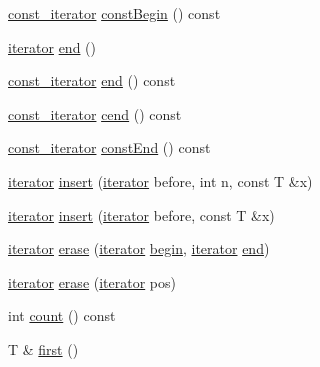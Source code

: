 \begin{DoxyCompactItemize}
\item 
\hyperlink{class_q_vector_a01e19bfad7fefd3e97ef197f4ed2cceb}{const\+\_\+iterator} \hyperlink{class_q_vector_a8f2ae9da9b4f929a1cbb718e2ff1a9ca}{const\+Begin} () const 
\item 
\hyperlink{class_q_vector_af6ac26e0dfede6e3045be0c947201267}{iterator} \hyperlink{class_q_vector_aee13fe5819dcac8aee22f40f31c2790b}{end} ()
\item 
\hyperlink{class_q_vector_a01e19bfad7fefd3e97ef197f4ed2cceb}{const\+\_\+iterator} \hyperlink{class_q_vector_ad13adb8ee2256f8b583509d7d9c4ca44}{end} () const 
\item 
\hyperlink{class_q_vector_a01e19bfad7fefd3e97ef197f4ed2cceb}{const\+\_\+iterator} \hyperlink{class_q_vector_aae87e757422aae4f12f8b8b60b2efb19}{cend} () const 
\item 
\hyperlink{class_q_vector_a01e19bfad7fefd3e97ef197f4ed2cceb}{const\+\_\+iterator} \hyperlink{class_q_vector_a86b54d84b2435c97d8ec62d5149eeee8}{const\+End} () const 
\item 
\hyperlink{class_q_vector_af6ac26e0dfede6e3045be0c947201267}{iterator} \hyperlink{class_q_vector_a85e9511cdd9b7949828749a8092af924}{insert} (\hyperlink{class_q_vector_af6ac26e0dfede6e3045be0c947201267}{iterator} before, int n, const T \&x)
\item 
\hyperlink{class_q_vector_af6ac26e0dfede6e3045be0c947201267}{iterator} \hyperlink{class_q_vector_acb1662d362fcf2fcc2ae820d08fd159d}{insert} (\hyperlink{class_q_vector_af6ac26e0dfede6e3045be0c947201267}{iterator} before, const T \&x)
\item 
\hyperlink{class_q_vector_af6ac26e0dfede6e3045be0c947201267}{iterator} \hyperlink{class_q_vector_af58c46c4f0db158717e382fe894c1484}{erase} (\hyperlink{class_q_vector_af6ac26e0dfede6e3045be0c947201267}{iterator} \hyperlink{class_q_vector_ad0c2c0e80b789c3a78a8c3a32dba31cc}{begin}, \hyperlink{class_q_vector_af6ac26e0dfede6e3045be0c947201267}{iterator} \hyperlink{class_q_vector_aee13fe5819dcac8aee22f40f31c2790b}{end})
\item 
\hyperlink{class_q_vector_af6ac26e0dfede6e3045be0c947201267}{iterator} \hyperlink{class_q_vector_a86403f70f137b660c6750f2b37c1e7d0}{erase} (\hyperlink{class_q_vector_af6ac26e0dfede6e3045be0c947201267}{iterator} pos)
\item 
int \hyperlink{class_q_vector_a7523e0dd8ab0759ad53b32d18da10780}{count} () const 
\item 
T \& \hyperlink{class_q_vector_a85cff791949dfb35bc432c6c5afae966}{first} ()
\item 

\end{DoxyCompactItemize}
